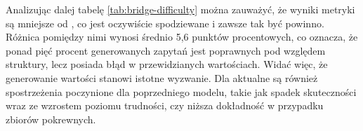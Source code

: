 Analizując dalej tabelę \ref{tab:bridge-difficulty} można zauważyć, że wyniki metryki  są mniejsze od , co jest oczywiście spodziewane i zawsze tak być powinno. Różnica pomiędzy nimi wynosi średnio 5,6 punktów procentowych, co oznacza, że ponad pięć procent generowanych zapytań jest poprawnych pod względem struktury, lecz posiada błąd w przewidzianych wartościach. Widać więc, że generowanie wartości stanowi istotne wyzwanie. Dla  aktualne są również spostrzeżenia poczynione dla poprzedniego modelu, takie jak spadek skuteczności wraz ze wzrostem poziomu trudności, czy niższa dokładność w przypadku zbiorów pokrewnych.

